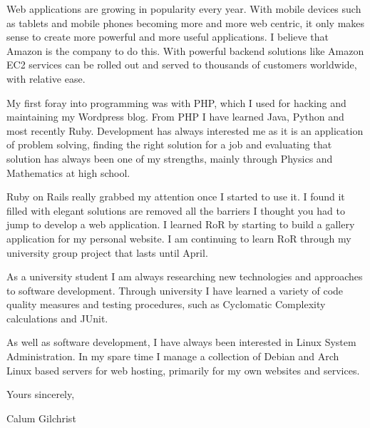 


\setlength{\parskip}{0.5em}




Web applications are growing in popularity every year. With mobile devices such
as tablets and mobile phones becoming more and more web centric, it only makes
sense to create more powerful and more useful applications. I believe that
Amazon is the company to do this. With powerful backend solutions like Amazon
EC2 services can be rolled out and served to thousands of customers worldwide,
with relative ease.


My first foray into programming was with PHP, which I used for hacking and
maintaining my Wordpress blog. From PHP I have learned Java, Python and most
recently Ruby. Development has always interested me as it is an application of
problem solving, finding the right solution for a job and evaluating that
solution has always been one of my strengths, mainly through Physics and
Mathematics at high school.

Ruby on Rails really grabbed my attention once I started to use it. I found it
filled with elegant solutions are removed all the barriers I thought you had to
jump to develop a web application. I learned RoR by starting to build a gallery
application for my personal website. I am continuing to learn RoR through my
university group project that lasts until April.


As a university student I am always researching new technologies and approaches
to software development. Through university I have learned a variety of code
quality measures and testing procedures, such as Cyclomatic Complexity
calculations and JUnit.

As well as software development, I have always been interested in Linux System
Administration. In my spare time I manage a collection of Debian and Arch Linux
based servers for web hosting, primarily for my own websites and services.

\bigskip
Yours sincerely,


Calum Gilchrist

